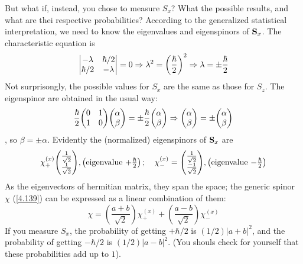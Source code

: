 But what if, instead, you chose to measure $S_x$? What the possible results, and what are thei respective probabilities? According to the generalized statistical interpretation,  we need to know the eigenvalues and eigenspinors of $\vb{S}_x$. The characteristic equation is $$\mqty|-\lambda&\hbar/2\\\hbar/2&-\lambda|=0\Rightarrow \lambda^2=\left(\frac{\hbar}{2}\right)^2\Rightarrow \lambda =\pm\frac{\hbar}{2}$$
Not surprisongly, the possible values for $S_x$ are the same as those for $S_z$. The eigenspinor are obtained in the usual way: $$\frac{\hbar}{2}\mqty(0&1\\1&0)\mqty(\alpha\\\beta)=\pm \frac{\hbar}{2}\mqty(\alpha\\\beta)\Rightarrow \mqty(\alpha\\\beta)=\pm \mqty(\alpha\\\beta)$$, so $\beta=\pm\alpha$. Evidently the (normalized) eigenspinors of $\vb{S}_x$ are
\begin{equation}\label{4.151}
	\chi_+^{(x)}\mqty(\frac{1}{\sqrt{2}}\\\frac{1}{\sqrt{2}}),\left(\mbox{eigenvalue $+\frac{\hbar}{2}$}\right);\quad \chi_-^{(x)}=\mqty(\frac{1}{\sqrt{2}}\\\frac{-1}{\sqrt{2}}),\left(\mbox{eigenvalue $-\frac{\hbar}{2}$}\right)
\end{equation}
As the eigenvectors of hermitian matrix, they span the space; the generic spinor $\chi$ (\ref{4.139}) can be expressed as a linear combination of them:
\begin{equation}\label{4.152}
	\chi = \left(\frac{a+b}{\sqrt{2}}\right)\chi_+^{(x)} + \left(\frac{a-b}{\sqrt{2}}\right)\chi_-^{(x)}
\end{equation}
If you measure $S_x$, the probability of getting $+\hbar/2$ is $(1/2)|a+b|^2$, and the probability of getting $-\hbar/2$ is $(1/2)|a-b|^2$. (You shouls check for yourself that these probabilities add up to $1$).

